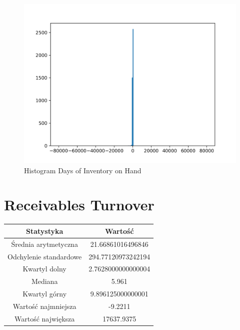 \documentclass{article}
\begin{document}
\begin{figure}[h!]
    \includegraphics[width=\linewidth]{variables/Days of Inventory on Hand.png}
    \caption{Histogram Days of Inventory on Hand }
\end{figure}\section{ Receivables Turnover }

\begin{center}
    \begin{tabular}{|c | c|} 
    \hline
    Statystyka & Wartość \\
    \hline\hline
    Średnia arytmetyczna & 21.66861016496846 \\ 
    \hline
    Odchylenie standardowe & 294.77120973242194 \\
    \hline
    Kwartyl dolny & 2.7628000000000004 \\
    \hline
    Mediana & 5.961 \\
    \hline
    Kwartyl górny & 9.896125000000001 \\
    \hline
    Wartość najmniejsza & -9.2211 \\
    \hline
    Wartość największa & 17637.9375 \\
    \hline
   \end{tabular}
\end{center}
\end{document}
